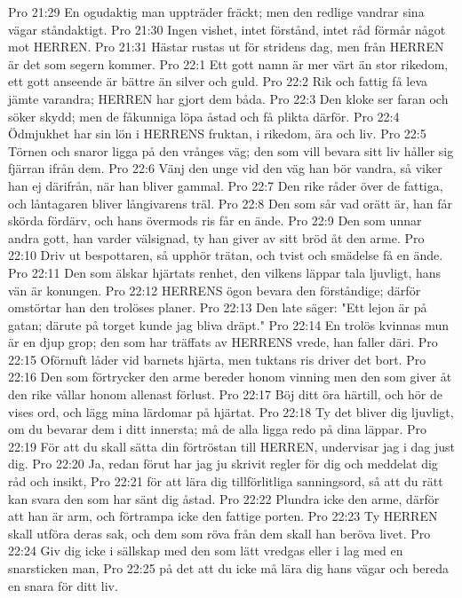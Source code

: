 Pro 21:29  En ogudaktig man uppträder fräckt; men den redlige vandrar sina vägar ståndaktigt.
Pro 21:30  Ingen vishet, intet förstånd, intet råd förmår något mot HERREN.
Pro 21:31  Hästar rustas ut för stridens dag, men från HERREN är det som segern kommer.
Pro 22:1  Ett gott namn är mer värt än stor rikedom, ett gott anseende är bättre än silver och guld.
Pro 22:2  Rik och fattig få leva jämte varandra; HERREN har gjort dem båda.
Pro 22:3  Den kloke ser faran och söker skydd; men de fåkunniga löpa åstad och få plikta därför.
Pro 22:4  Ödmjukhet har sin lön i HERRENS fruktan, i rikedom, ära och liv.
Pro 22:5  Törnen och snaror ligga på den vrånges väg; den som vill bevara sitt liv håller sig fjärran ifrån dem.
Pro 22:6  Vänj den unge vid den väg han bör vandra, så viker han ej därifrån, när han bliver gammal.
Pro 22:7  Den rike råder över de fattiga, och låntagaren bliver långivarens träl.
Pro 22:8  Den som sår vad orätt är, han får skörda fördärv, och hans övermods ris får en ände.
Pro 22:9  Den som unnar andra gott, han varder välsignad, ty han giver av sitt bröd åt den arme.
Pro 22:10  Driv ut bespottaren, så upphör trätan, och tvist och smädelse få en ände.
Pro 22:11  Den som älskar hjärtats renhet, den vilkens läppar tala ljuvligt, hans vän är konungen.
Pro 22:12  HERRENS ögon bevara den förståndige; därför omstörtar han den trolöses planer.
Pro 22:13  Den late säger: "Ett lejon är på gatan; därute på torget kunde jag bliva dräpt."
Pro 22:14  En trolös kvinnas mun är en djup grop; den som har träffats av HERRENS vrede, han faller däri.
Pro 22:15  Oförnuft låder vid barnets hjärta, men tuktans ris driver det bort.
Pro 22:16  Den som förtrycker den arme bereder honom vinning men den som giver åt den rike vållar honom allenast förlust.
Pro 22:17  Böj ditt öra härtill, och hör de vises ord, och lägg mina lärdomar på hjärtat.
Pro 22:18  Ty det bliver dig ljuvligt, om du bevarar dem i ditt innersta; må de alla ligga redo på dina läppar.
Pro 22:19  För att du skall sätta din förtröstan till HERREN, undervisar jag i dag just dig.
Pro 22:20  Ja, redan förut har jag ju skrivit regler för dig och meddelat dig råd och insikt,
Pro 22:21  för att lära dig tillförlitliga sanningsord, så att du rätt kan svara den som har sänt dig åstad.
Pro 22:22  Plundra icke den arme, därför att han är arm, och förtrampa icke den fattige porten.
Pro 22:23  Ty HERREN skall utföra deras sak, och dem som röva från dem skall han beröva livet.
Pro 22:24  Giv dig icke i sällskap med den som lätt vredgas eller i lag med en snarsticken man,
Pro 22:25  på det att du icke må lära dig hans vägar och bereda en snara för ditt liv.
